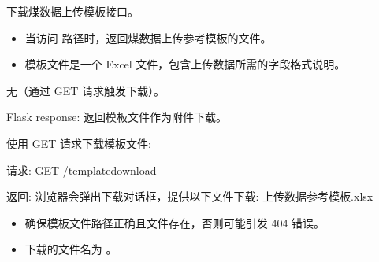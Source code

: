 \documentclass[a4paper,12pt,english]{sphinxmanual}
\begin{document}
\begin{fulllineitems}
\label{\detokenize{api/login:login.Download}}
\pysigstartsignatures
{}
\pysigstopsignatures
\sphinxAtStartPar
下载煤数据上传模板接口。
\begin{description}
\begin{itemize}
\item {} 
\sphinxAtStartPar
当访问  路径时，返回煤数据上传参考模板的文件。

\item {} 
\sphinxAtStartPar
模板文件是一个 Excel 文件，包含上传数据所需的字段格式说明。

\end{itemize}

\sphinxAtStartPar
无（通过 GET 请求触发下载）。

\sphinxAtStartPar
Flask response: 返回模板文件作为附件下载。

\sphinxAtStartPar
使用 GET 请求下载模板文件:

\begin{sphinxVerbatim}[commandchars=\\\{\}]
请求:
GET /templatedownload

返回:
浏览器会弹出下载对话框，提供以下文件下载:
上传数据参考模板.xlsx
\end{sphinxVerbatim}

\begin{itemize}
\item {} 
\sphinxAtStartPar
确保模板文件路径正确且文件存在，否则可能引发 404 错误。

\item {} 
\sphinxAtStartPar
下载的文件名为 。

\end{itemize}

\end{description}

\end{fulllineitems}

\end{document}
